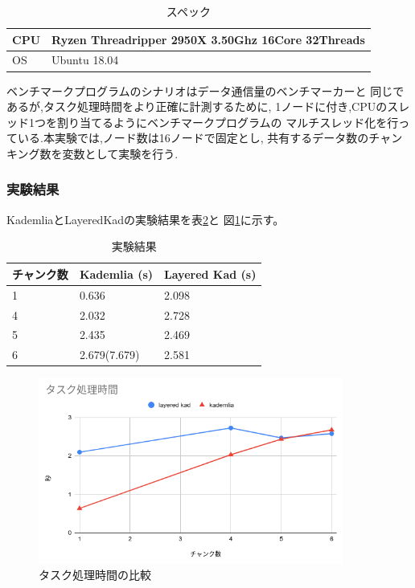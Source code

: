 \documentclass[sotsuron]{jcsie}
\begin{document}
\begin{table}[H]
	\caption{スペック}	
	\centering
	\label{table:spec-ryzen}
	\begin{tabular}{|l|l|}
		\hline
		CPU &   
		Ryzen Threadripper 2950X 3.50Ghz 16Core 32Threads \\ 
		\hline	
		OS  &   
		Ubuntu 18.04 \\ 
		\hline
	\end{tabular}	
\end{table}

ベンチマークプログラムのシナリオはデータ通信量のベンチマーカーと
同じであるが,タスク処理時間をより正確に計測するために,
1ノードに付き,CPUのスレッド1つを割り当てるようにベンチマークプログラムの
マルチスレッド化を行っている.本実験では,ノード数は16ノードで固定とし,
共有するデータ数のチャンキング数を変数として実験を行う.

\subsubsection{実験結果}
KademliaとLayeredKadの実験結果を表\ref{table:calc-result}と
図\ref{fig:calc_compare.png}に示す。

\begin{table}[H]
	\caption{実験結果}
	\centering
	\label{table:calc-result}
	\begin{tabular}{|l|l|l|}
		\hline
 		 チャンク数 &
		 Kademlia (s) &
		 Layered Kad (s)\\ 
		\hline
		1               &
		0.636           &
		2.098\\
		\hline
		4               &
		2.032           &
		2.728\\
		\hline
		5               &
		2.435           &
		2.469\\
		\hline
		6               &
		2.679(7.679)           &
		2.581\\
		\hline
	\end{tabular}
\end{table}

\begin{figure}[H]
	\centering
	\includegraphics[width=10cm]{./assets/image/calc_compare.png}
	\caption{タスク処理時間の比較}
	\label{fig:calc_compare.png}
\end{figure}
\end{document}
